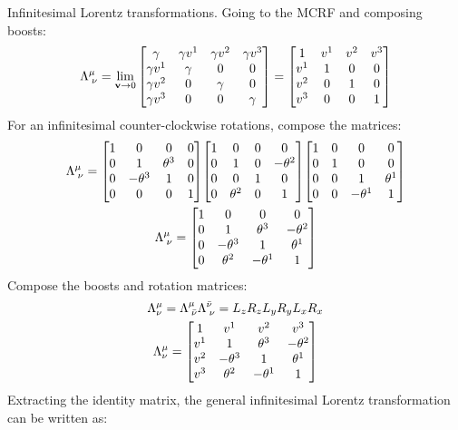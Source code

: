 \documentclass{report}
\begin{document}
\begin{subquests}
	\item Infinitesimal Lorentz transformations.
	Going to the MCRF and composing boosts:
	\begin{gather*}
		\Lambda^{\mu}_{\;\nu} = \lim_{{\vb v}\to 0}\mqty[
			\gamma & \gamma v^1 & \gamma v^2 & \gamma v^3 \\
			\gamma v^1 & \gamma & 0 & 0 \\
			\gamma v^2 & 0 & \gamma & 0 \\
			\gamma v^3 & 0 & 0 & \gamma
		] = \mqty[
			1 &  v^1 &  v^2 &  v^3 \\
			v^1 & 1 & 0 & 0 \\
			v^2 & 0 & 1 & 0 \\
			v^3 & 0 & 0 & 1
		]
	\end{gather*}
	For an infinitesimal counter-clockwise rotations, compose the matrices:
	\begin{gather*}
		\Lambda^{\mu}_{\;\nu} = \mqty[
			1 & 0 & 0 & 0 \\
			0 & 1 & \theta^3 & 0 \\
			0 & -\theta^3 & 1 & 0\\
			0 & 0 & 0 & 1
		]
		\mqty[
			1 & 0 & 0 & 0 \\
			0 & 1 & 0 & -\theta^2 \\
			0 & 0 & 1 & 0 \\
			0 & \theta^2 & 0 & 1
		]
		\mqty[
			1 & 0 & 0 & 0 \\
			0 & 1 & 0 & 0 \\
			0 & 0 & 1 & \theta^1 \\
			0 & 0 & -\theta^1 & 1
		] \\
		\Lambda^{\mu}_{\;\nu} = \mqty[
			1 & 0 & 0 & 0 \\
			0 & 1 & \theta^3 & -\theta^2 \\
			0 & -\theta^3 & 1 & \theta^1 \\
			0 & \theta^2 & -\theta^1 & 1
		]
	\end{gather*}
	Compose the boosts and rotation matrices:
	\begin{gather*}
		\Lambda^{\mu}_{\nu} = \Lambda^{\mu}_{\;\bar{\nu}}\Lambda^{\bar{\nu}}_{\;\nu} = 
		L_z R_z L_y R_y L_x R_x \\
		\Lambda^{\mu}_{\nu} = 
		\mqty[
			1 & v^1 & v^2 & v^3 \\
			v^1 & 1 & \theta^3 & -\theta^2 \\
			v^2 & -\theta^3 & 1 & \theta^1 \\
			v^3 & \theta^2 & -\theta^1 & 1
		]
	\end{gather*}
	Extracting the identity matrix, the general infinitesimal Lorentz transformation can be written as:

\end{subquests}
\end{document}
